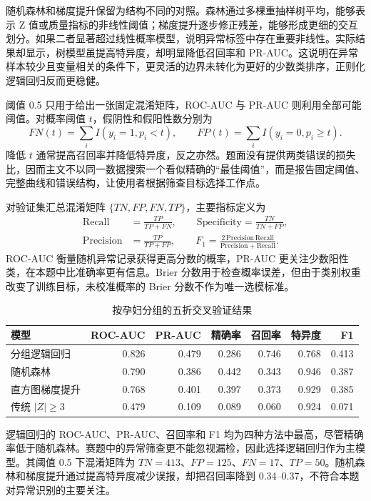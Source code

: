 \documentclass[UTF8,a4paper,12pt]{ctexart}
\begin{document}
随机森林和梯度提升保留为结构不同的对照。森林通过多棵重抽样树平均，能够表示 Z 值或质量指标的非线性阈值；梯度提升逐步修正残差，能够形成更细的交互划分。如果二者显著超过线性概率模型，说明异常标签中存在重要非线性。实际结果却显示，树模型虽提高特异度，却明显降低召回率和 PR-AUC。这说明在异常样本较少且变量相关的条件下，更灵活的边界未转化为更好的少数类排序，正则化逻辑回归反而更稳健。

阈值 0.5 只用于给出一张固定混淆矩阵，ROC-AUC 与 PR-AUC 则利用全部可能阈值。对概率阈值 $t$，假阴性和假阳性数分别为
\begin{equation}
FN(t)=\sum_i I(y_i=1,p_i<t),\qquad
FP(t)=\sum_i I(y_i=0,p_i\ge t).
\label{eq:thresholderrors}
\end{equation}
降低 $t$ 通常提高召回率并降低特异度，反之亦然。题面没有提供两类错误的损失比，因而主文不以同一数据搜索一个看似精确的“最佳阈值”，而是报告固定阈值、完整曲线和错误结构，让使用者根据筛查目标选择工作点。

对验证集汇总混淆矩阵 $\{TN,FP,FN,TP\}$，主要指标定义为
\begin{align}
\mathrm{Recall}&=\frac{TP}{TP+FN},\qquad
\mathrm{Specificity}=\frac{TN}{TN+FP}, \label{eq:classmetric1}\\
\mathrm{Precision}&=\frac{TP}{TP+FP},\qquad
F_1=\frac{2\,\mathrm{Precision}\,\mathrm{Recall}}{\mathrm{Precision}+\mathrm{Recall}}.
\label{eq:classmetric2}
\end{align}
ROC-AUC 衡量随机异常记录获得更高分数的概率，PR-AUC 更关注少数阳性类，在本题中比准确率更有信息。Brier 分数用于检查概率误差，但由于类别权重改变了训练目标，未校准概率的 Brier 分数不作为唯一选模标准。

\begin{table}[H]
\centering
\caption{按孕妇分组的五折交叉验证结果}
\small
\begin{tabular}{lrrrrrr}
\toprule
模型 & ROC-AUC & PR-AUC & 精确率 & 召回率 & 特异度 & F1 \\
\midrule
分组逻辑回归 & 0.826 & 0.479 & 0.286 & 0.746 & 0.768 & 0.413 \\
随机森林 & 0.790 & 0.386 & 0.442 & 0.343 & 0.946 & 0.387 \\
直方图梯度提升 & 0.768 & 0.401 & 0.397 & 0.373 & 0.929 & 0.385 \\
传统 $|Z|\ge3$ & 0.479 & 0.109 & 0.089 & 0.060 & 0.924 & 0.071 \\
\bottomrule
\end{tabular}
\end{table}

逻辑回归的 ROC-AUC、PR-AUC、召回率和 F1 均为四种方法中最高，尽管精确率低于随机森林。赛题中的异常筛查更不能忽视漏检，因此选择逻辑回归作为主模型。其阈值 0.5 下混淆矩阵为 $TN=413$、$FP=125$、$FN=17$、$TP=50$。随机森林和梯度提升通过提高特异度减少误报，却把召回率降到 0.34--0.37，不符合本题对异常识别的主要关注。
\end{document}
